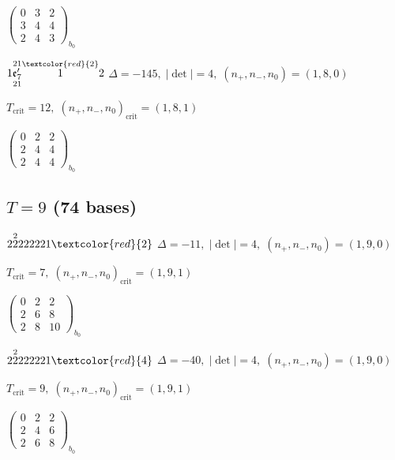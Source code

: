 \documentclass[10pt]{article}
\begin{document}
\hspace{2em}$\left(\begin{smallmatrix}0 & 3 & 2 \\ 3 & 4 & 4 \\ 2 & 4 & 3\end{smallmatrix}\right)_{\!b_0}$

\smallskip

$1\overset{21}{\underset{21}{\mathfrak{e}_7'}}\overset{\textcolor{red}{2}}{1}2$ \quad $\Delta=-145,\; |\det|=4,\; (n_+,n_-,n_0)=(1,8,0)$

\hspace{1em}$T_{\text{crit}}=12,\; (n_+,n_-,n_0)_{\text{crit}}=(1,8,1)$

\hspace{2em}$\left(\begin{smallmatrix}0 & 2 & 2 \\ 2 & 4 & 4 \\ 2 & 4 & 4\end{smallmatrix}\right)_{\!b_0}$


\subsection*{$T = 9$ \quad (74 bases)}
\smallskip

$2\overset{2}{2}222221\textcolor{red}{2}$ \quad $\Delta=-11,\; |\det|=4,\; (n_+,n_-,n_0)=(1,9,0)$

\hspace{1em}$T_{\text{crit}}=7,\; (n_+,n_-,n_0)_{\text{crit}}=(1,9,1)$

\hspace{2em}$\left(\begin{smallmatrix}0 & 2 & 2 \\ 2 & 6 & 8 \\ 2 & 8 & 10\end{smallmatrix}\right)_{\!b_0}$

$2\overset{2}{2}222221\textcolor{red}{4}$ \quad $\Delta=-40,\; |\det|=4,\; (n_+,n_-,n_0)=(1,9,0)$

\hspace{1em}$T_{\text{crit}}=9,\; (n_+,n_-,n_0)_{\text{crit}}=(1,9,1)$

\hspace{2em}$\left(\begin{smallmatrix}0 & 2 & 2 \\ 2 & 4 & 6 \\ 2 & 6 & 8\end{smallmatrix}\right)_{\!b_0}$
\end{document}
